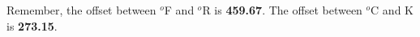 





Remember, the offset between $^{o}$F and $^{o}$R is {\bf 459.67}.  The offset between $^{o}$C and K is {\bf 273.15}.




